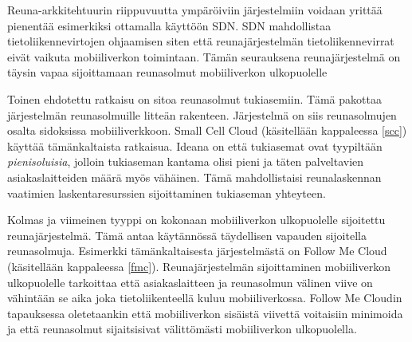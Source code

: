 Reuna-arkkitehtuurin riippuvuutta ympäröiviin järjestelmiin voidaan yrittää pienentää esimerkiksi ottamalla käyttöön SDN. SDN mahdollistaa tietoliikennevirtojen ohjaamisen siten että reunajärjestelmän tietoliikennevirrat eivät vaikuta mobiiliverkon toimintaan. Tämän seurauksena reunajärjestelmä on täysin vapaa sijoittamaan reunasolmut mobiiliverkon ulkopuolelle

Toinen ehdotettu ratkaisu on sitoa reunasolmut tukiasemiin. Tämä pakottaa järjestelmän reunasolmuille litteän rakenteen. Järjestelmä on siis reunasolmujen osalta sidoksissa mobiiliverkkoon. Small Cell Cloud (käsitellään kappaleessa \ref{scc}) käyttää tämänkaltaista ratkaisua. Ideana on että tukiasemat ovat tyypiltään \textit{pienisoluisia}, jolloin tukiaseman kantama olisi pieni ja täten palveltavien asiakaslaitteiden määrä myös vähäinen. Tämä mahdollistaisi reunalaskennan vaatimien laskentaresurssien sijoittaminen tukiaseman yhteyteen.

Kolmas ja viimeinen tyyppi on kokonaan mobiiliverkon ulkopuolelle sijoitettu reunajärjestelmä. Tämä antaa käytännössä täydellisen vapauden sijoitella reunasolmuja. Esimerkki tämänkaltaisesta järjestelmästä on Follow Me Cloud (käsitellään kappaleessa \ref{fmc}). Reunajärjestelmän sijoittaminen mobiiliverkon ulkopuolelle tarkoittaa että asiakaslaitteen ja reunasolmun välinen viive on vähintään se aika joka tietoliikenteellä kuluu mobiiliverkossa. Follow Me Cloudin tapauksessa oletetaankin että mobiiliverkon sisäistä viivettä voitaisiin minimoida ja että reunasolmut sijaitsisivat välittömästi mobiiliverkon ulkopuolella. 
















